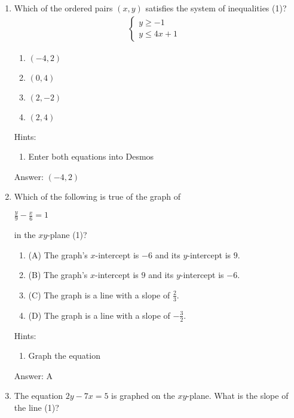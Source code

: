 \documentclass{article}
\begin{document}
\begin{enumerate}
{	      Answer: c
	      }

	\item {
	      Which of the ordered pairs $(x,y)$ satisfies the system of inequalities (1)?
	      \[
		      \begin{array}{l}
			      \begin{cases}
				      y \geq -1 & \\
				      y \leq 4x + 1
			      \end{cases}
		      \end{array}
	      \]

	      \begin{enumerate}
		      \item{$(-4,2)$}
		      \item{$(0,4)$}
		      \item{$(2,-2)$}
		      \item{$(2,4)$}
	      \end{enumerate}

	      Hints:
	      \begin{enumerate}
		      \item{Enter both equations into Desmos}
	      \end{enumerate}

	      Answer: $(-4,2)$
	      }


	\item {
	      Which of the following is true of the graph of

	      \(
	      \frac{y}{9} - \frac{x}{6} = 1
	      \)

	      in the $xy$-plane (1)?


	      \begin{enumerate}
		      \item (A) The graph's \(x\)-intercept is \(-6\) and its \(y\)-intercept is \(9\).
		      \item (B) The graph's \(x\)-intercept is \(9\) and its \(y\)-intercept is \(-6\).
		      \item (C) The graph is a line with a slope of \(\frac{2}{3}\).
		      \item (D) The graph is a line with a slope of \(-\frac{3}{2}\).
	      \end{enumerate}

	      Hints:
	      \begin{enumerate}
		      \item{Graph the equation}
	      \end{enumerate}

	      Answer: A
	      }
	\item {The equation \(2y-7x=5\) is graphed on the $xy$-plane. What is the slope of the line (1)?

}
\end{enumerate}
\end{document}
